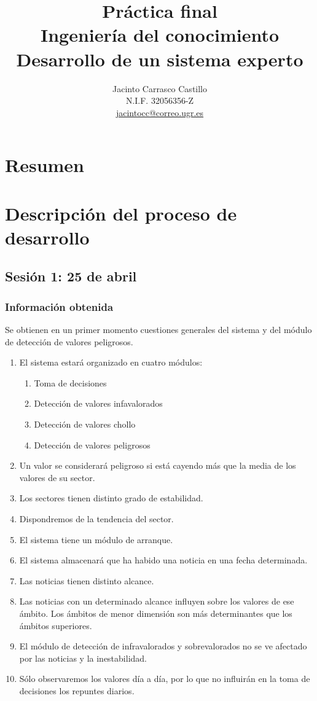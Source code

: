 \documentclass[11pt,leqno]{article}
\title{Práctica final\\
		Ingeniería del conocimiento\\
		Desarrollo de un sistema experto}
\author{Jacinto Carrasco Castillo 	\\
		N.I.F. 32056356-Z			\\ 
		\href{jacintocc@correo.ugr.es}{jacintocc@correo.ugr.es}}
\theoremstyle{definition_wo_parentheses}
\theoremstyle{plain}
\theoremstyle{remark}
\begin{document}
\maketitle

\tableofcontents

\section{Resumen}

\section{Descripción del proceso de desarrollo}

\subsection{Sesión 1: 25 de abril}

\subsubsection{Información obtenida}

	Se obtienen en un primer momento cuestiones generales del sistema y del módulo de detección de valores peligrosos.	
	
\begin{enumerate}
\item El sistema estará organizado en cuatro módulos:
	\begin{enumerate}[I]
	\item Toma de decisiones
	\item Detección de valores infavalorados
	\item Detección de valores chollo
	\item Detección de valores peligrosos
\end{enumerate}
\item Un valor se considerará peligroso si está cayendo más que la media de los valores de su sector.
\item Los sectores tienen distinto grado de estabilidad.
\item Dispondremos de la tendencia del sector.
\item El sistema tiene un módulo de arranque.
\item El sistema almacenará que ha habido una noticia en una fecha determinada.
\item Las noticias tienen distinto alcance. 
\item Las noticias con un determinado alcance influyen sobre los valores de ese ámbito. Los ámbitos de menor dimensión son más determinantes que los ámbitos superiores.
\item El módulo de detección de infravalorados y sobrevalorados no se ve afectado por las noticias y la inestabilidad.
\item Sólo observaremos los valores día a día, por lo que no influirán en la toma de decisiones los repuntes diarios.
\end{enumerate}
	
\end{document}
